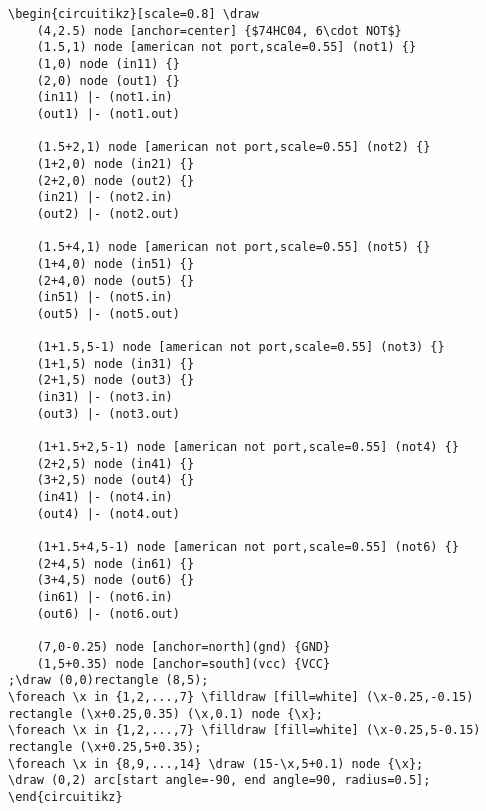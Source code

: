 \documentclass[a4paper,12pt,dvipsnames]{article}
\begin{document}
\begin{verbatim}
\begin{circuitikz}[scale=0.8] \draw
	(4,2.5) node [anchor=center] {$74HC04, 6\cdot NOT$}
	(1.5,1) node [american not port,scale=0.55] (not1) {}
	(1,0) node (in11) {}
	(2,0) node (out1) {}
	(in11) |- (not1.in)
	(out1) |- (not1.out)

	(1.5+2,1) node [american not port,scale=0.55] (not2) {}
	(1+2,0) node (in21) {}
	(2+2,0) node (out2) {}
	(in21) |- (not2.in)
	(out2) |- (not2.out)

	(1.5+4,1) node [american not port,scale=0.55] (not5) {}
	(1+4,0) node (in51) {}
	(2+4,0) node (out5) {}
	(in51) |- (not5.in)
	(out5) |- (not5.out)

	(1+1.5,5-1) node [american not port,scale=0.55] (not3) {}
	(1+1,5) node (in31) {}
	(2+1,5) node (out3) {}
	(in31) |- (not3.in)
	(out3) |- (not3.out)

	(1+1.5+2,5-1) node [american not port,scale=0.55] (not4) {}
	(2+2,5) node (in41) {}
	(3+2,5) node (out4) {}
	(in41) |- (not4.in)
	(out4) |- (not4.out)

	(1+1.5+4,5-1) node [american not port,scale=0.55] (not6) {}
	(2+4,5) node (in61) {}
	(3+4,5) node (out6) {}
	(in61) |- (not6.in)
	(out6) |- (not6.out)

	(7,0-0.25) node [anchor=north](gnd) {GND}
	(1,5+0.35) node [anchor=south](vcc) {VCC}
;\draw (0,0)rectangle (8,5);
\foreach \x in {1,2,...,7} \filldraw [fill=white] (\x-0.25,-0.15) rectangle (\x+0.25,0.35) (\x,0.1) node {\x};
\foreach \x in {1,2,...,7} \filldraw [fill=white] (\x-0.25,5-0.15) rectangle (\x+0.25,5+0.35);
\foreach \x in {8,9,...,14} \draw (15-\x,5+0.1) node {\x};
\draw (0,2) arc[start angle=-90, end angle=90, radius=0.5];
\end{circuitikz}
\end{verbatim}






\newpage{}

\tableofcontents
\end{document}
